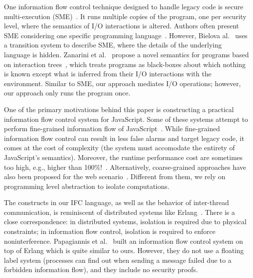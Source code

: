\documentclass{sigplanconf}
\newcommand{\Red}[1]{{\color{red} #1}}
\newcommand{\todo}[2]{\Red{\textbf{TODO[}#1\textbf{]:} #2}} %
\begin{document}
One information flow control technique designed to handle legacy code is
secure multi-execution (SME)~\cite{Devriese:2010}. It runs
multiple copies of the program, one per security level, where the semantics of
I/O interactions is altered. Authors often present
SME considering one specific programming
language~\cite{KULeuven-350547,Rafnson:2013}. However, Bielova
al.~\cite{Biel-etal-11-TR} uses a transition system to describe SME, where the
details of the underlying language is hidden.  Zanarini et
al.~\cite{ZanariniJR13} propose a novel semantics for programs based on
interaction trees~\cite{jacobs-tutorial}, which treats programs as black-boxes
about which nothing is known except what is inferred from their I/O interactions
with the environment. Similar to SME, our approach mediates I/O
operations; however, our approach only runs the program once.


One of the primary motivations behind this paper is constructing a practical
information flow control system for JavaScript.  Some of these systems attempt
to perform fine-grained information flow of
JavaScript~\cite{Hedin:2012,ConDOM,JSFlow}. While fine-grained information flow
control can result in less false alarms and target legacy code, it comes at the
cost of complexity (the system must accomodate the entirety of JavaScript's
semantics). Moreover, the runtime performance cost are sometimes too high, e.g.,
higher than 100\%!~\cite{JSFlow}.  Alternatively, coarse-grained approaches have
also been proposed for the web
scenario~\cite{Yip:2009:PBS,DeGroef:2012,conf/esorics/AkhaweLHSS13}. \Red{Different
from them, we rely on programming level abstraction to isolate
computations.}




The constructs in our IFC language, as well as the behavior of
inter-thread communication, is reminiscent of distributed systems
like Erlang~\cite{Armstrong03makingreliable}.  There is a close
correspondence: in distributed systems, isolation is required due to
physical constraints; in information flow control, isolation is
required to enforce noninterference.  Papagiannis et al.~\cite{Papagiannis_enforcinguser}
built an information flow control system on top of Erlang which is quite
similar to ours.  However, they do not use a floating label system (processes
can find out when sending a message failed due to a forbidden information flow),
and they include no security proofs.
\end{document}
